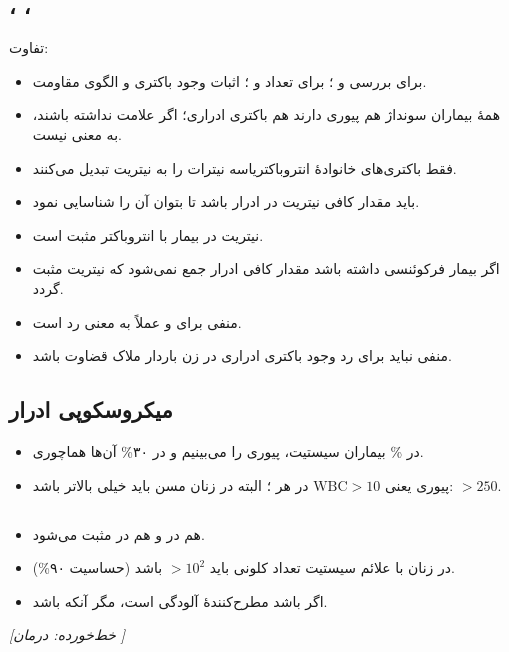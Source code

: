 \subsection*{، ، }
تفاوت:
\begin{itemize}
\item {} برای بررسی  و ؛  برای تعداد  و ؛  اثبات وجود باکتری و الگوی مقاومت.
\item همهٔ بیماران سونداژ هم پیوری دارند هم باکتری ادراری؛ اگر علامت نداشته باشند، به معنی  نیست.
\item فقط باکتری‌های خانوادهٔ انتروباکتریاسه نیترات را به نیتریت تبدیل می‌کنند.
\item باید مقدار کافی نیتریت در ادرار باشد تا بتوان آن را شناسایی نمود.
\item نیتریت در بیمار با  انتروباکتر مثبت است.
\item اگر بیمار فرکوئنسی داشته باشد مقدار کافی ادرار جمع نمی‌شود که نیتریت مثبت گردد.
\item {} منفی برای  و  عملاً به معنی رد  است.
\item {} منفی نباید برای رد وجود باکتری ادراری در زن باردار ملاک قضاوت باشد.
\end{itemize}

\subsection*{میکروسکوپی ادرار}
\begin{itemize}
\item در \% بیماران سیستیت، پیوری را می‌بینیم و در ۳۰\% آن‌ها هماچوری.
\item پیوری یعنی $\mathrm{WBC}>10$ در هر ؛ البته در زنان مسن باید خیلی بالاتر باشد: $>250$.
\end{itemize}

\subsection*{}
\begin{itemize}
\item هم در  و هم در  مثبت می‌شود. %
\item در زنان با علائم سیستیت تعداد کلونی باید $>10^2$ باشد (حساسیت ۹۰\%).
\item اگر  باشد مطرح‌کنندهٔ آلودگی است، مگر آنکه  باشد.
\end{itemize}
\textit{[خط‌خورده: درمان ]} %

